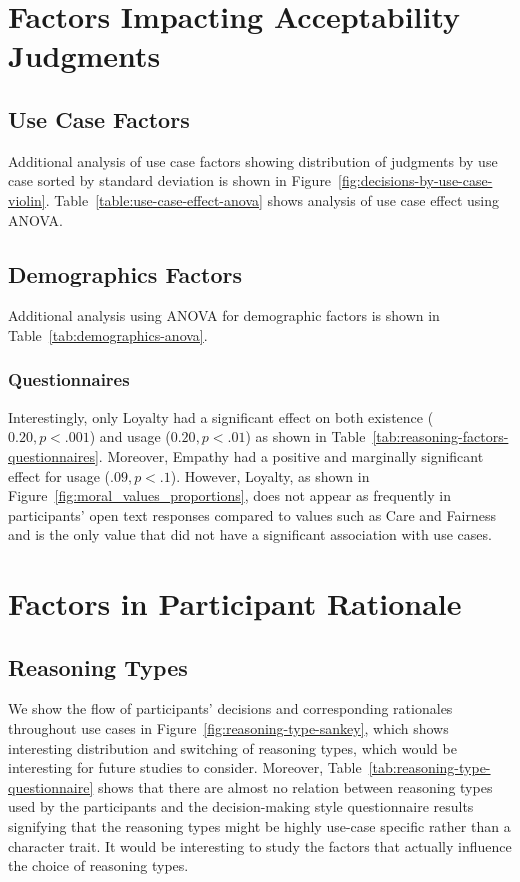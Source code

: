 \section{Factors Impacting Acceptability Judgments}
\subsection{Use Case Factors}
Additional analysis of use case factors showing distribution of judgments by use case sorted by standard deviation is shown in Figure~\ref{fig:decisions-by-use-case-violin}. Table~\ref{table:use-case-effect-anova} shows analysis of use case effect using ANOVA.



\subsection{Demographics Factors}
Additional analysis using ANOVA for demographic factors is shown in Table~\ref{tab:demographics-anova}.



\subsubsection{Questionnaires}
Interestingly, only Loyalty had a significant effect on both existence ($0.20, p<.001$) and usage ($0.20, p<.01$) as shown in Table~\ref{tab:reasoning-factors-questionnaires}. Moreover, Empathy had a positive and marginally significant effect for usage ($.09, p<.1$). However, Loyalty, as shown in Figure~\ref{fig:moral_values_proportions}, does not appear as frequently in participants' open text responses compared to values such as Care and Fairness and is the only value that did not have a significant association with use cases. 

\section{Factors in Participant Rationale}

\subsection{Reasoning Types}
We show the flow of participants' decisions and corresponding rationales throughout use cases in Figure~\ref{fig:reasoning-type-sankey}, which shows interesting distribution and switching of reasoning types, which would be interesting for future studies to consider. Moreover, Table~\ref{tab:reasoning-type-questionnaire} shows that there are almost no relation between reasoning types used by the participants and the decision-making style questionnaire results signifying that the reasoning types might be highly use-case specific rather than a character trait. It would be interesting to study the factors that actually influence the choice of reasoning types. 



